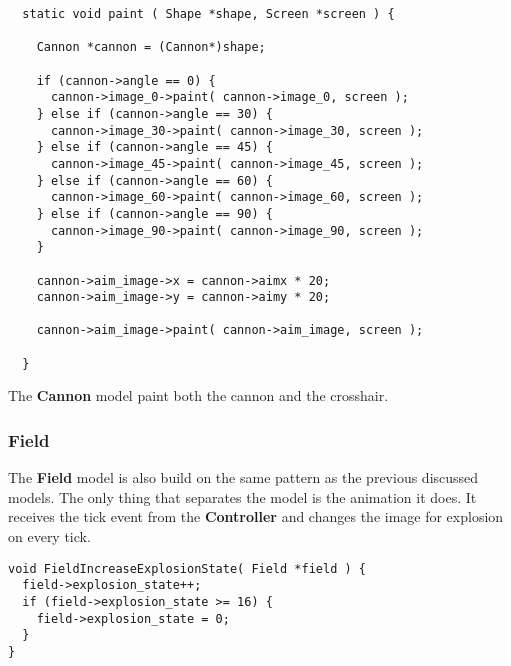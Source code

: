 \begin{lstlisting}
  static void paint ( Shape *shape, Screen *screen ) {

    Cannon *cannon = (Cannon*)shape;

    if (cannon->angle == 0) {
      cannon->image_0->paint( cannon->image_0, screen );
    } else if (cannon->angle == 30) {
      cannon->image_30->paint( cannon->image_30, screen );
    } else if (cannon->angle == 45) {
      cannon->image_45->paint( cannon->image_45, screen );
    } else if (cannon->angle == 60) {
      cannon->image_60->paint( cannon->image_60, screen );
    } else if (cannon->angle == 90) {
      cannon->image_90->paint( cannon->image_90, screen );
    }

    cannon->aim_image->x = cannon->aimx * 20;
    cannon->aim_image->y = cannon->aimy * 20;

    cannon->aim_image->paint( cannon->aim_image, screen );

  }
\end{lstlisting}
The {\bf Cannon} model paint both the cannon and the crosshair.

\subsubsection{Field}
The {\bf Field} model is also build on the same pattern as the previous discussed models. The only
thing that separates the model is the animation it does. It receives the tick event from the {\bf
  Controller} and changes the image for explosion on every tick.
\begin{lstlisting}
void FieldIncreaseExplosionState( Field *field ) {
  field->explosion_state++;
  if (field->explosion_state >= 16) {
    field->explosion_state = 0;
  }
}
\end{lstlisting}
